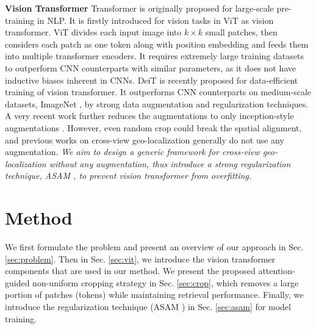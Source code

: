 \documentclass[10pt,twocolumn,letterpaper]{article}
\begin{document}
\noindent\textbf{Vision Transformer} Transformer \cite{transformer} is originally proposed for large-scale pre-training in NLP. 
It is firstly introduced for vision tasks in ViT \cite{vit} as vision transformer. ViT divides each input image into $k\times k$ small patches, then considers each patch as one token along with position embedding and feeds them into multiple transformer encoders. It requires extremely large training datasets to outperform CNN counterparts with similar parameters, as it does not have inductive biases inherent in CNNs. DeiT \cite{deit} is recently proposed for data-efficient training of vision transformer. It outperforms CNN counterparts on medium-scale datasets, \ie ImageNet \cite{deng2009imagenet}, by strong data augmentation and regularization techniques. A very recent work \cite{gong} further reduces the augmentations to only inception-style augmentations \cite{szegedy2016rethinking}. However, even random crop could break the spatial alignment, and previous works on cross-view geo-localization generally do not use any augmentation. \emph{We aim to design a generic framework for cross-view geo-localization without any augmentation, thus introduce a strong regularization technique, \ie ASAM \cite{ASAM}, to prevent vision transformer from overfitting.}


\section{Method}
We first formulate the problem and present an overview of our approach in Sec. \ref{sec:problem}. Then in Sec. \ref{sec:vit}, we introduce the vision transformer components that are used in our method. We present the proposed attention-guided non-uniform cropping strategy in Sec. \ref{sec:crop}, which removes a large portion of patches (tokens) while maintaining retrieval performance. 
Finally, we introduce the regularization technique (ASAM \cite{ASAM}) in Sec. \ref{sec:asam} for model training. 
\end{document}
